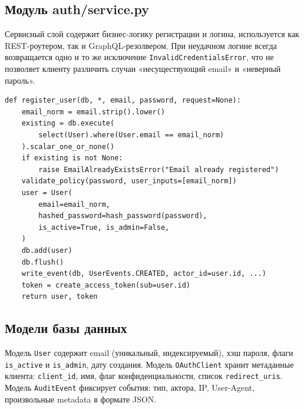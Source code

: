 \documentclass[oneside,a4paper,14pt]{extarticle}
\begin{document}
\subsection*{Модуль auth/service.py}

Сервисный слой содержит бизнес-логику регистрации и логина, используется как REST-роутером, так и GraphQL-резолвером. При неудачном логине всегда возвращается одно и то же исключение \texttt{InvalidCredentialsError}, что не позволяет клиенту различить случаи «несуществующий email» и «неверный пароль».

\begin{lstlisting}
def register_user(db, *, email, password, request=None):
    email_norm = email.strip().lower()
    existing = db.execute(
        select(User).where(User.email == email_norm)
    ).scalar_one_or_none()
    if existing is not None:
        raise EmailAlreadyExistsError("Email already registered")
    validate_policy(password, user_inputs=[email_norm])
    user = User(
        email=email_norm,
        hashed_password=hash_password(password),
        is_active=True, is_admin=False,
    )
    db.add(user)
    db.flush()
    write_event(db, UserEvents.CREATED, actor_id=user.id, ...)
    token = create_access_token(sub=user.id)
    return user, token
\end{lstlisting}

\subsection*{Модели базы данных}

Модель \texttt{User} содержит email (уникальный, индексируемый), хэш пароля, флаги \texttt{is\_active} и \texttt{is\_admin}, дату создания. Модель \texttt{OAuthClient} хранит метаданные клиента: \texttt{client\_id}, имя, флаг конфиденциальности, список \texttt{redirect\_uris}. Модель \texttt{AuditEvent} фиксирует события: тип, актора, IP, User-Agent, произвольные metadata в формате JSON.
\end{document}
